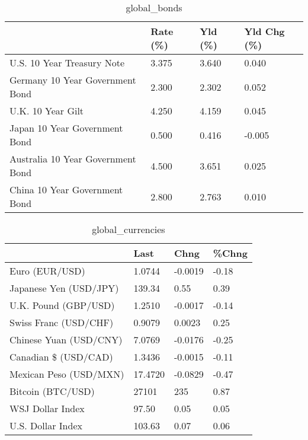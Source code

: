 \documentclass{article}%
\begin{document}
%


\begin{table}[htbp]%
\caption{global\_bonds}%
\centering%
\begin{adjustbox}{width=1\textwidth}%
\begin{tabular}{llll}
\toprule
                                  & Rate (\%) & Yld (\%) & Yld Chg (\%) \\
\midrule
       U.S. 10 Year Treasury Note &    3.375 &   3.640 &       0.040 \\
  Germany 10 Year Government Bond &    2.300 &   2.302 &       0.052 \\
                U.K. 10 Year Gilt &    4.250 &   4.159 &       0.045 \\
    Japan 10 Year Government Bond &    0.500 &   0.416 &      -0.005 \\
Australia 10 Year Government Bond &    4.500 &   3.651 &       0.025 \\
    China 10 Year Government Bond &    2.800 &   2.763 &       0.010 \\
\bottomrule
\end{tabular}
%
\end{adjustbox}%
\end{table}

%


\begin{table}[htbp]%
\caption{global\_currencies}%
\centering%
\begin{adjustbox}{width=1\textwidth}%
\begin{tabular}{llll}
\toprule
                       &    Last &    Chng & \%Chng \\
\midrule
        Euro (EUR/USD) &  1.0744 & -0.0019 & -0.18 \\
Japanese Yen (USD/JPY) &  139.34 &    0.55 &  0.39 \\
  U.K. Pound (GBP/USD) &  1.2510 & -0.0017 & -0.14 \\
 Swiss Franc (USD/CHF) &  0.9079 &  0.0023 &  0.25 \\
Chinese Yuan (USD/CNY) &  7.0769 & -0.0176 & -0.25 \\
  Canadian \$ (USD/CAD) &  1.3436 & -0.0015 & -0.11 \\
Mexican Peso (USD/MXN) & 17.4720 & -0.0829 & -0.47 \\
     Bitcoin (BTC/USD) &   27101 &     235 &  0.87 \\
      WSJ Dollar Index &   97.50 &    0.05 &  0.05 \\
     U.S. Dollar Index &  103.63 &    0.07 &  0.06 \\
\bottomrule
\end{tabular}
%
\end{adjustbox}%
\end{table}
\end{document}
